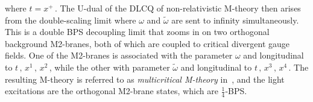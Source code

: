 \documentclass[11pt]{article}
\renewcommand{\tilde}[1]{\widetilde{#1}}
\renewcommand{\emph}[1]{\textit{#1}}
\begin{document}
%
where $t = x^+$\,.
The U-dual of the DLCQ of non-relativistic M-theory then arises from the double-scaling limit where $\omega$ and $\tilde{\omega}$ are sent to infinity simultaneously. This is a double BPS decoupling limit that zooms in on two orthogonal background M2-branes, both of which are coupled to critical divergent gauge fields. One of the M2-branes is associated with the parameter $\omega$ and longitudinal to $t\,, \, x^1\,, \, x^2$\,, while the other with parameter $\tilde{\omega}$ and longitudinal to $t\,, \, x^3\,, \, x^4$\,. The resulting M-theory is referred to as \emph{multicritical M-theory} in~\cite{Blair:2023noj}, and the light excitations are the orthogonal M2-brane states, which are $\frac{1}{4}$-BPS. 

\vspace{3mm}
\end{document}
